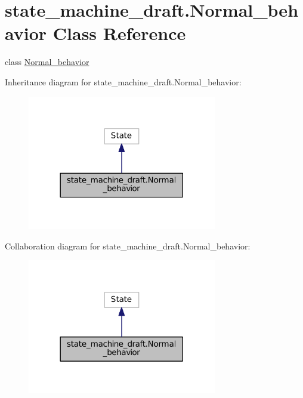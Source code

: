 \hypertarget{classstate__machine__draft_1_1Normal__behavior}{}\section{state\+\_\+machine\+\_\+draft.\+Normal\+\_\+behavior Class Reference}
\label{classstate__machine__draft_1_1Normal__behavior}


class \hyperlink{classstate__machine__draft_1_1Normal__behavior}{Normal\+\_\+behavior}  




Inheritance diagram for state\+\_\+machine\+\_\+draft.\+Normal\+\_\+behavior\+:
\nopagebreak
\begin{figure}[H]
\begin{center}
\leavevmode
\includegraphics[width=234pt]{classstate__machine__draft_1_1Normal__behavior__inherit__graph}
\end{center}
\end{figure}


Collaboration diagram for state\+\_\+machine\+\_\+draft.\+Normal\+\_\+behavior\+:
\nopagebreak
\begin{figure}[H]
\begin{center}
\leavevmode
\includegraphics[width=234pt]{classstate__machine__draft_1_1Normal__behavior__coll__graph}
\end{center}
\end{figure}
